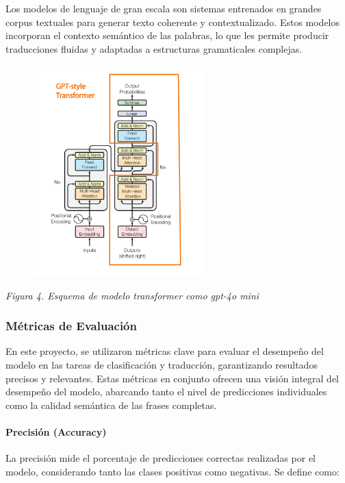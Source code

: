 \documentclass[10pt]{article}
\begin{document}
Los modelos de lenguaje de gran escala son sistemas entrenados en grandes corpus textuales para generar texto coherente y contextualizado. Estos modelos incorporan el contexto semántico de las palabras, lo que les permite producir traducciones fluidas y adaptadas a estructuras gramaticales complejas.

\vspace{1\baselineskip}
\begin{figure}[H]
\centering
\includegraphics[width=6.6cm,height=8.14cm]{./images/image1.png}
\end{figure}


\begin{center}
\textit{Figura 4. Esquema de modelo transformer como gpt-4o mini}
\end{center}


\subsubsection{Métricas de Evaluación}

En este proyecto, se utilizaron métricas clave para evaluar el desempeño del modelo en las tareas de clasificación y traducción, garantizando resultados precisos y relevantes. Estas métricas en conjunto ofrecen una visión integral del desempeño del modelo, abarcando tanto el nivel de predicciones individuales como la calidad semántica de las frases completas.

\paragraph{Precisión (Accuracy)}

La precisión mide el porcentaje de predicciones correctas realizadas por el modelo, considerando tanto las clases positivas como negativas. Se define como:
\end{document}
